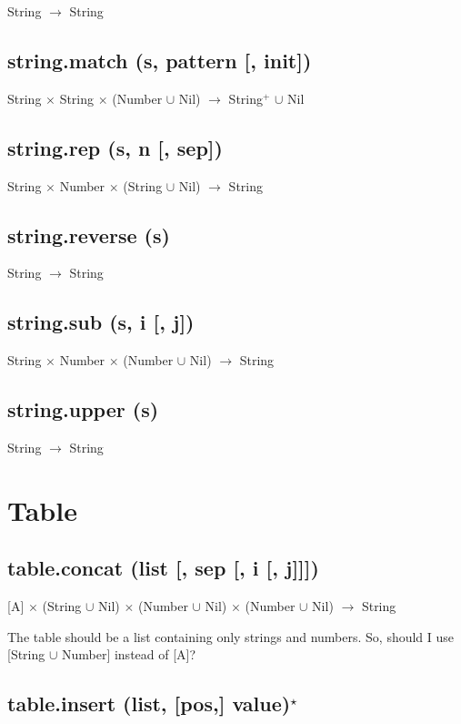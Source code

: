\documentclass[12pt]{article}
\begin{document}
String $\rightarrow$ String

\subsection{string.match (s, pattern [, init])}

String $\times$
String $\times$
(Number $\cup$ Nil) $\rightarrow$
String$^+$ $\cup$ Nil

\subsection{string.rep (s, n [, sep])}

String $\times$
Number $\times$
(String $\cup$ Nil) $\rightarrow$
String

\subsection{string.reverse (s)}

String $\rightarrow$ String

\subsection{string.sub (s, i [, j])}

String $\times$
Number $\times$
(Number $\cup$ Nil) $\rightarrow$
String

\subsection{string.upper (s)}

String $\rightarrow$ String

\newpage

\section{Table}

\subsection{table.concat (list [, sep [, i [, j]]])}

[A] $\times$
(String $\cup$ Nil) $\times$
(Number $\cup$ Nil) $\times$
(Number $\cup$ Nil) $\rightarrow$
String

The table should be a list containing only strings and numbers.
So, should I use [String $\cup$ Number] instead of [A]?

\subsection{table.insert (list, [pos,] value)$^\star$}
\end{document}
